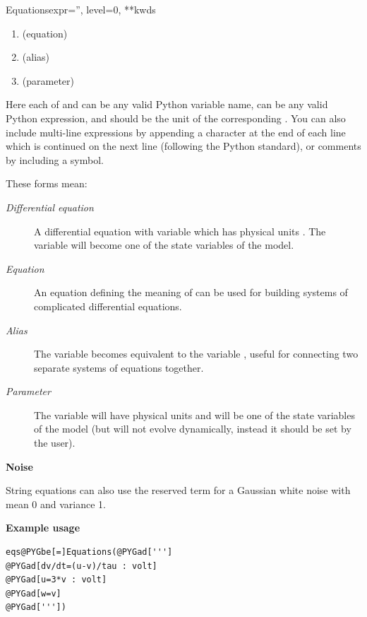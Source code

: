 \documentclass[letterpaper,10pt]{manual}
\begin{document}
\begin{classdesc}{Equations}{expr='', level=0, **kwds}
\begin{enumerate}
\item {} 
 (equation)

\item {} 
 (alias)

\item {} 
 (parameter)

\end{enumerate}

Here each of  and  can be any valid Python variable name,
 can be any valid Python expression, and  should be the
unit of the corresponding . You can also include multi-line
expressions by appending a \code{\textbackslash{}} character at the end of each line
which is continued on the next line (following the Python standard),
or comments by including a \code{\#} symbol.

These forms mean:
\begin{description}
\item[\emph{Differential equation}]
A differential equation with variable  which has physical
units . The variable  will become one of the state
variables of the model.

\item[\emph{Equation}]
An equation defining the meaning of  can be used for building
systems of complicated differential equations.

\item[\emph{Alias}]
The variable  becomes equivalent to the variable , useful
for connecting two separate systems of equations together.

\item[\emph{Parameter}]
The variable  will have physical units  and will be
one of the state variables of the model (but will not evolve
dynamically, instead it should be set by the user).

\end{description}
\textbf{Noise}

String equations can also use the reserved term  for a
Gaussian white noise with mean 0 and variance 1.

\textbf{Example usage}

\begin{Verbatim}[commandchars=@\[\]]
eqs@PYGbe[=]Equations(@PYGad[''']
@PYGad[dv/dt=(u-v)/tau : volt]
@PYGad[u=3*v : volt]
@PYGad[w=v]
@PYGad['''])
\end{Verbatim}
\end{classdesc}
\end{document}

